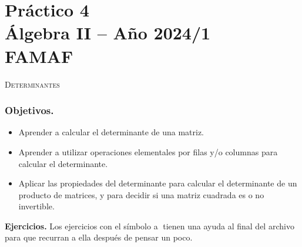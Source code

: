 \chapter*{ Práctico 4 \\ Álgebra  II -- Año 2024/1 \\ FAMAF}\label{practico-4}
    

\centerline{\textsc{Determinantes}}


\subsection*{Objetivos.}

\begin{itemize}
\item Aprender a calcular el determinante de una matriz.

\item Aprender a utilizar operaciones elementales por filas y/o columnas para calcular el determinante.

\item Aplicar las propiedades del determinante para calcular el determinante de un producto de matrices, y para decidir si una matriz cuadrada es o no invertible.
\end{itemize}
		

\noindent \textbf{Ejercicios.} Los ejercicios con el símbolo \textcircled{a} tienen una ayuda al final del archivo para que recurran a ella después de pensar un poco.

